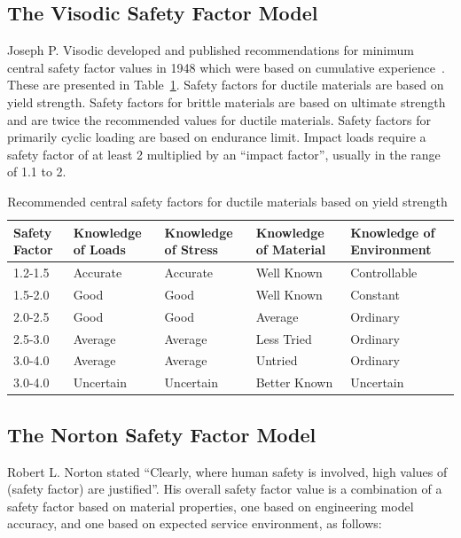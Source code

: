 \subsection{The Visodic Safety Factor Model}

Joseph P. Visodic developed and published recommendations for minimum central safety factor values in 1948 which were based on cumulative experience~\cite{joseph2001}\cite{juvinall1983}. These are presented in Table~\ref{tbl-visodic}. Safety factors for ductile materials are based on yield strength. Safety factors for brittle materials are based on ultimate strength and are twice the recommended values for ductile materials. Safety factors for primarily cyclic loading are based on endurance limit. Impact loads require a safety factor of at least 2 multiplied by an ``impact factor'', usually in the range of 1.1 to 2.

\begin{table}
    \footnotesize
    \centering
    \begin{tabular}{p{} p{} p{} p{} p{}}
      \toprule
        Safety Factor & Knowledge of Loads & Knowledge of Stress & Knowledge of Material & Knowledge of Environment \\
      \midrule
        1.2-1.5 & Accurate & Accurate & Well Known & Controllable \\
        1.5-2.0 & Good & Good & Well Known & Constant \\
        2.0-2.5 & Good & Good & Average & Ordinary \\
        2.5-3.0 & Average & Average & Less Tried & Ordinary \\
        3.0-4.0 & Average & Average & Untried & Ordinary \\
        3.0-4.0 & Uncertain & Uncertain & Better Known & Uncertain \\
      \bottomrule
    \end{tabular}
  \caption[Recommended central safety factors for ductile materials based on yield strength]{Recommended central safety factors for ductile materials based on yield strength~\cite{joseph2001}}
  \label{tbl-visodic}
\end{table}

\subsection{The Norton Safety Factor Model}

Robert L. Norton  stated ``Clearly, where human safety is involved, high values of (safety factor) are justified''. His overall safety factor value is a combination of a safety factor based on material properties, one based on engineering model accuracy, and one based on expected service environment, as follows:

